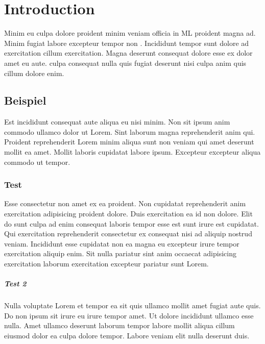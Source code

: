 
\chapter{Introduction}\label{ch:introduction}

Minim eu culpa dolore proident minim veniam officia in \ac{ML} proident magna ad. Minim fugiat labore excepteur tempor non \cite{test.2022}. Incididunt tempor sunt dolore ad exercitation cillum exercitation. Magna deserunt consequat dolore esse ex dolor amet eu aute. \textcite{test.2022} culpa consequat nulla quis fugiat deserunt nisi culpa anim quis cillum dolore enim.

\section{Beispiel}\label{sec:beispiel}

Est incididunt consequat aute aliqua eu nisi minim. Non sit ipsum anim commodo ullamco dolor ut Lorem. Sint laborum magna reprehenderit anim qui. Proident reprehenderit Lorem minim aliqua sunt non veniam qui amet deserunt mollit ea amet. Mollit laboris cupidatat labore ipsum. Excepteur excepteur aliqua commodo ut tempor.

\subsection{Test}\label{subsec:test}

Esse consectetur non amet ex ea proident. Non cupidatat reprehenderit anim exercitation adipisicing proident dolore. Duis exercitation ea id non dolore. Elit do sunt culpa ad enim consequat laboris tempor esse est sunt irure est cupidatat. Qui exercitation reprehenderit consectetur ex consequat nisi ad aliquip nostrud veniam. Incididunt esse cupidatat non ea magna eu excepteur irure tempor exercitation aliquip enim. Sit nulla pariatur sint anim occaecat adipisicing exercitation laborum exercitation excepteur pariatur sunt Lorem.

\paragraph{Test 2}\label{par:blub}

Nulla voluptate Lorem et tempor ea sit quis ullamco mollit amet fugiat aute quis. Do non ipsum sit irure eu irure tempor amet. Ut dolore incididunt ullamco esse nulla. Amet ullamco deserunt laborum tempor labore mollit aliqua cillum eiusmod dolor ea culpa dolore tempor. Labore veniam elit nulla deserunt duis.